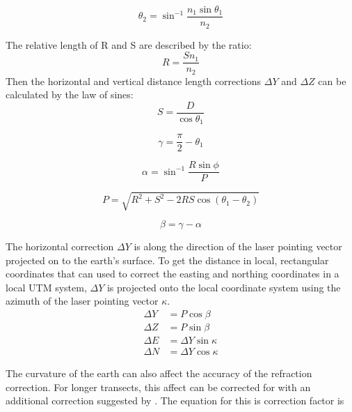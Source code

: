 \begin{equation}\label{eq:snellslaw}
      \theta_2 = \sin^{-1}{\frac{n_1 \sin{\theta_1}}{n_2}}
\end{equation}

The relative length of R and S are described by the ratio:
\begin{equation}
      R = \frac{S n_1}{n_2}
\end{equation}
Then the horizontal and vertical distance length corrections $\Delta Y$ and $\Delta Z$ can be calculated by the law of sines:
\begin{equation}
      S = \frac{D}{\cos{\theta_1}}
\end{equation}

\begin{equation}
      \gamma = \frac{\pi}{2} - \theta_1
\end{equation}

\begin{equation}
      \alpha = \sin^{-1}{\frac{R \sin{\phi}}{P}}
\end{equation}

\begin{equation}
      P = \sqrt{R^2 + S^2 - 2RS \cos{(\theta_1 - \theta_2)}}
\end{equation}

\begin{equation}
      \beta = \gamma - \alpha
\end{equation}

The horizontal correction $\Delta Y$ is along the direction of the laser pointing vector projected on to the earth's surface. To get the distance in local, rectangular coordinates that can used to correct the easting and northing coordinates in a local UTM system, $\Delta Y$ is projected onto the local coordinate system using the azimuth of the laser pointing vector $\kappa$.
\begin{align}
      \Delta Y & = P \cos{\beta}         \\
      \Delta Z & = P \sin{\beta}         \\
      \Delta E & = \Delta Y \sin{\kappa} \\
      \Delta N & = \Delta Y \cos{\kappa}
\end{align}


The curvature of the earth can also affect the accuracy of the refraction correction. For longer transects, this affect can be corrected for with an additional correction suggested by \citeauthor{Parrish2019}. The equation for this is correction factor is

